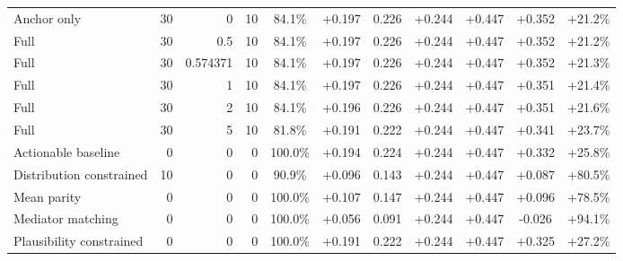 \begin{table}[htbp]
\begin{tabular}{lrrrccccccc}
Anchor only & 30 & 0 & 10 & 84.1\% & +0.197 & 0.226 & +0.244 & +0.447 & +0.352 & +21.2\% \\
Full & 30 & 0.5 & 10 & 84.1\% & +0.197 & 0.226 & +0.244 & +0.447 & +0.352 & +21.2\% \\
Full & 30 & 0.574371 & 10 & 84.1\% & +0.197 & 0.226 & +0.244 & +0.447 & +0.352 & +21.3\% \\
Full & 30 & 1 & 10 & 84.1\% & +0.197 & 0.226 & +0.244 & +0.447 & +0.351 & +21.4\% \\
Full & 30 & 2 & 10 & 84.1\% & +0.196 & 0.226 & +0.244 & +0.447 & +0.351 & +21.6\% \\
Full & 30 & 5 & 10 & 81.8\% & +0.191 & 0.222 & +0.244 & +0.447 & +0.341 & +23.7\% \\
Actionable baseline & 0 & 0 & 0 & 100.0\% & +0.194 & 0.224 & +0.244 & +0.447 & +0.332 & +25.8\% \\
Distribution constrained & 10 & 0 & 0 & 90.9\% & +0.096 & 0.143 & +0.244 & +0.447 & +0.087 & +80.5\% \\
Mean parity & 0 & 0 & 0 & 100.0\% & +0.107 & 0.147 & +0.244 & +0.447 & +0.096 & +78.5\% \\
Mediator matching & 0 & 0 & 0 & 100.0\% & +0.056 & 0.091 & +0.244 & +0.447 & -0.026 & +94.1\% \\
Plausibility constrained & 0 & 0 & 0 & 100.0\% & +0.191 & 0.222 & +0.244 & +0.447 & +0.325 & +27.2\% \\
\bottomrule
\end{tabular}
\end{table}